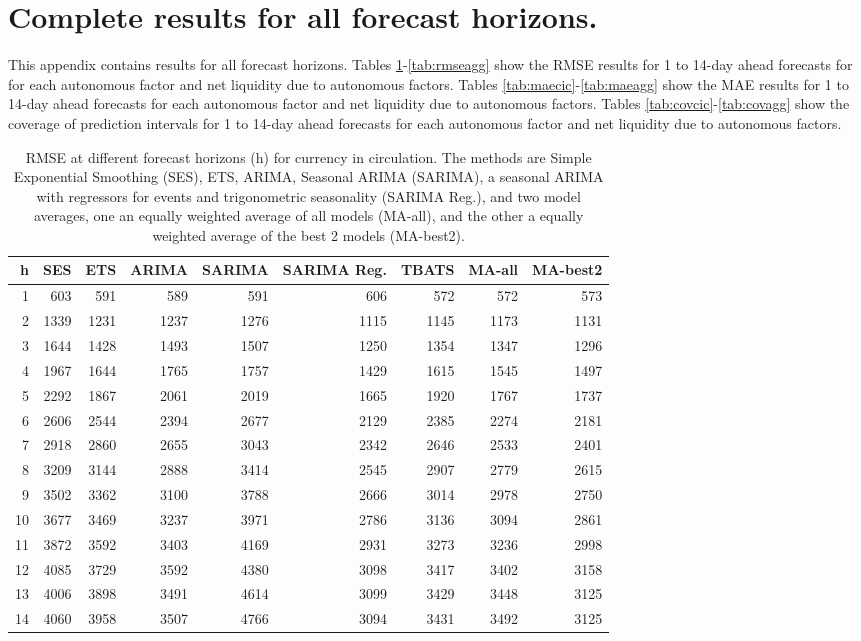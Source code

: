 \section{Complete results for all forecast horizons.}\label{sec:appmae}
This appendix contains results for all forecast horizons. Tables \ref{tab:rmsecic}-\ref{tab:rmseagg} show the RMSE results for 1 to 14-day ahead forecasts for for each autonomous factor and net liquidity due to autonomous factors. Tables \ref{tab:maecic}-\ref{tab:maeagg} show the MAE results for 1 to 14-day ahead forecasts for each autonomous factor and net liquidity due to autonomous factors. Tables \ref{tab:covcic}-\ref{tab:covagg} show the coverage of prediction intervals for 1 to 14-day ahead forecasts for each autonomous factor and net liquidity due to autonomous factors.

\begin{table}[ht]
\centering
\begin{tabular}{rrrrrrrrr}
  \hline
h & SES & ETS & ARIMA & SARIMA & SARIMA Reg. & TBATS & MA-all & MA-best2 \\ 
  \hline
1 & 603 & 591 & 589 & 591 & 606 & 572 & 572 & 573 \\ 
  2 & 1339 & 1231 & 1237 & 1276 & 1115 & 1145 & 1173 & 1131 \\ 
  3 & 1644 & 1428 & 1493 & 1507 & 1250 & 1354 & 1347 & 1296 \\ 
  4 & 1967 & 1644 & 1765 & 1757 & 1429 & 1615 & 1545 & 1497 \\ 
  5 & 2292 & 1867 & 2061 & 2019 & 1665 & 1920 & 1767 & 1737 \\ 
  6 & 2606 & 2544 & 2394 & 2677 & 2129 & 2385 & 2274 & 2181 \\ 
  7 & 2918 & 2860 & 2655 & 3043 & 2342 & 2646 & 2533 & 2401 \\ 
  8 & 3209 & 3144 & 2888 & 3414 & 2545 & 2907 & 2779 & 2615 \\ 
  9 & 3502 & 3362 & 3100 & 3788 & 2666 & 3014 & 2978 & 2750 \\ 
  10 & 3677 & 3469 & 3237 & 3971 & 2786 & 3136 & 3094 & 2861 \\ 
  11 & 3872 & 3592 & 3403 & 4169 & 2931 & 3273 & 3236 & 2998 \\ 
  12 & 4085 & 3729 & 3592 & 4380 & 3098 & 3417 & 3402 & 3158 \\ 
  13 & 4006 & 3898 & 3491 & 4614 & 3099 & 3429 & 3448 & 3125 \\ 
  14 & 4060 & 3958 & 3507 & 4766 & 3094 & 3431 & 3492 & 3125 \\ 
   \hline
\end{tabular}
\caption{RMSE at different forecast horizons (h) for currency in circulation. The methods are Simple Exponential Smoothing (SES), ETS, ARIMA, Seasonal ARIMA (SARIMA), a seasonal ARIMA with regressors for events and trigonometric seasonality (SARIMA Reg.), and two model averages, one an equally weighted average of all models (MA-all), and the other a equally weighted average of the best 2 models (MA-best2).} 
\label{tab:rmsecic}
\end{table}


